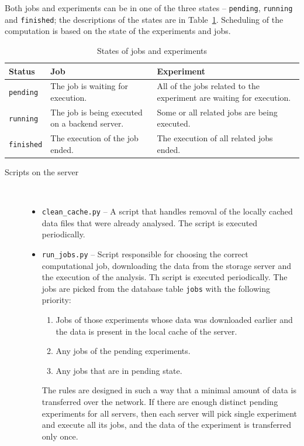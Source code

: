 \documentclass[
	digital,    %
	oneside,
	color,
	11pt,
	nocover,
	notable,
	nolof,
	nolot,
]{fithesis3}
\newenvironment{titlemize}[1]
{
	\begin{description}
	\item[#1]\
	\begin{itemize}
}
{
	\end{itemize}
 	\end{description}
}
\theoremstyle{definition}
\theoremstyle{remark}
\begin{document}
Both jobs and experiments can be in one of the three states -- \texttt{pending}, \texttt{running} and \texttt{finished}; the descriptions of the states are in Table~\ref{tab:states_jobs_exps}. Scheduling of the computation is based on the state of the experiments and jobs.

\begin{table}[H]
\begin{nomar}
\centering
\begin{tabular}{@{}lp{6cm}p{6cm}@{}} \toprule
\textbf{Status}   & \textbf{Job} & \textbf{Experiment} \\ \midrule
\texttt{pending}  & The job is waiting for execution. & All of the jobs related to the experiment are waiting for execution. \\ 
\texttt{running}  & The job is being executed on a backend server. & Some or all related jobs are being executed. \\ 
\texttt{finished} & The execution of the job ended. & The execution of all related jobs ended. \\ \bottomrule
\end{tabular}
\end{nomar}
\caption{States of jobs and experiments}
\label{tab:states_jobs_exps}
\end{table}

\begin{titlemize}{Scripts on the server}
\item \texttt{clean\_cache.py} -- A script that handles removal of the locally cached data files that were already analysed. The script is executed periodically.
\item \texttt{run\_jobs.py} -- Script responsible for choosing the correct computational job, downloading the data from the storage server and the execution of the analysis. Th script is executed periodically. The jobs are picked from the database table \texttt{jobs} with the following priority:
\begin{enumerate}
\item Jobs of those experiments whose data was downloaded earlier and the data is present in the local cache of the server.
\item Any jobs of the pending experiments.
\item Any jobs that are in pending state.
\end{enumerate}
The rules are designed in such a way that a minimal amount of data is transferred over the network. If there are enough distinct pending experiments for all servers, then each server will pick single experiment and execute all its jobs, and the data of the experiment is transferred only once.
\end{titlemize}
\end{document}
